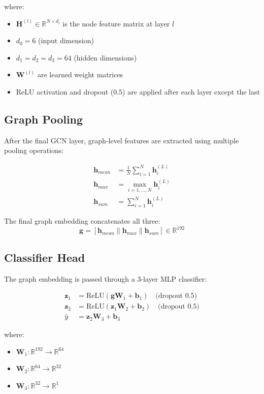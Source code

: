 \documentclass[11pt,a4paper]{article}
\begin{document}
where:
\begin{itemize}
    \item $\mathbf{H}^{(l)} \in \mathbb{R}^{N \times d_l}$ is the node feature matrix at layer $l$
    \item $d_0 = 6$ (input dimension)
    \item $d_1 = d_2 = d_3 = 64$ (hidden dimensions)
    \item $\mathbf{W}^{(l)}$ are learned weight matrices
    \item ReLU activation and dropout (0.5) are applied after each layer except the last
\end{itemize}

\subsection{Graph Pooling}

After the final GCN layer, graph-level features are extracted using multiple pooling operations:

\begin{align}
\mathbf{h}_{mean} &= \frac{1}{N} \sum_{i=1}^{N} \mathbf{h}_i^{(L)} \\
\mathbf{h}_{max} &= \max_{i=1,\ldots,N} \mathbf{h}_i^{(L)} \\
\mathbf{h}_{sum} &= \sum_{i=1}^{N} \mathbf{h}_i^{(L)}
\end{align}

The final graph embedding concatenates all three:
\begin{equation}
\mathbf{g} = [\mathbf{h}_{mean} \| \mathbf{h}_{max} \| \mathbf{h}_{sum}] \in \mathbb{R}^{192}
\end{equation}

\subsection{Classifier Head}

The graph embedding is passed through a 3-layer MLP classifier:

\begin{align}
\mathbf{z}_1 &= \text{ReLU}(\mathbf{g} \mathbf{W}_1 + \mathbf{b}_1) \quad \text{(dropout 0.5)} \\
\mathbf{z}_2 &= \text{ReLU}(\mathbf{z}_1 \mathbf{W}_2 + \mathbf{b}_2) \quad \text{(dropout 0.5)} \\
\hat{y} &= \mathbf{z}_2 \mathbf{W}_3 + \mathbf{b}_3
\end{align}

where:
\begin{itemize}
    \item $\mathbf{W}_1: \mathbb{R}^{192} \to \mathbb{R}^{64}$
    \item $\mathbf{W}_2: \mathbb{R}^{64} \to \mathbb{R}^{32}$
    \item $\mathbf{W}_3: \mathbb{R}^{32} \to \mathbb{R}^{1}$
\end{itemize}
\end{document}
